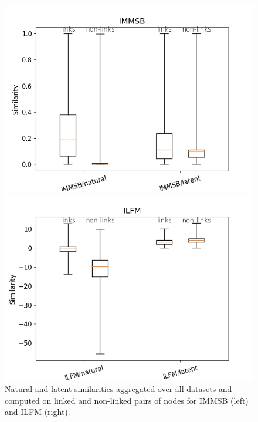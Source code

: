 \begin{figure}[h]
\centering
    \begin{minipage}{0.24\textwidth}
        \includegraphics[width=\textwidth]{img/corpus/homo_mustach_immsb}
    \end{minipage}
    \begin{minipage}{0.24\textwidth}
        \includegraphics[width=\textwidth]{img/corpus/homo_mustach_ilfm}
    \end{minipage}
    \caption{Natural and latent similarities aggregated over all datasets and computed on linked and non-linked pairs of nodes for IMMSB (left) and ILFM (right).}
    \label{fig:homo_mustach}
\end{figure}


